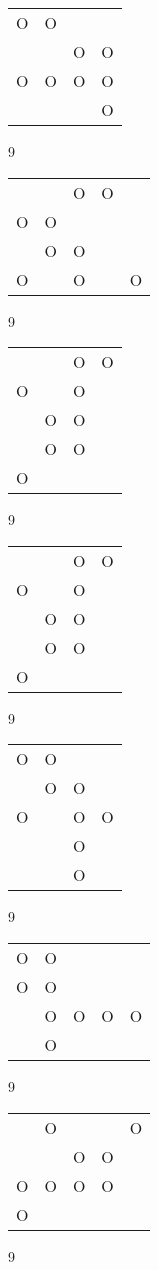 \begin{tabular}{|m{0.2cm}m{0.2cm}m{0.2cm}m{0.2cm}|}\hline
O&O& & \\
 & &O&O\\
O&O&O&O\\
 & & &O\\
\hline\end{tabular}9
\begin{tabular}{|m{0.2cm}m{0.2cm}m{0.2cm}m{0.2cm}m{0.2cm}|}\hline
 & &O&O& \\
O&O& & & \\
 &O&O& & \\
O& &O& &O\\
\hline\end{tabular}9
\begin{tabular}{|m{0.2cm}m{0.2cm}m{0.2cm}m{0.2cm}|}\hline
 & &O&O\\
O& &O& \\
 &O&O& \\
 &O&O& \\
O& & & \\
\hline\end{tabular}9
\begin{tabular}{|m{0.2cm}m{0.2cm}m{0.2cm}m{0.2cm}|}\hline
 & &O&O\\
O& &O& \\
 &O&O& \\
 &O&O& \\
O& & & \\
\hline\end{tabular}9
\begin{tabular}{|m{0.2cm}m{0.2cm}m{0.2cm}m{0.2cm}|}\hline
O&O& & \\
 &O&O& \\
O& &O&O\\
 & &O& \\
 & &O& \\
\hline\end{tabular}9
\begin{tabular}{|m{0.2cm}m{0.2cm}m{0.2cm}m{0.2cm}m{0.2cm}|}\hline
O&O& & & \\
O&O& & & \\
 &O&O&O&O\\
 &O& & & \\
\hline\end{tabular}9
\begin{tabular}{|m{0.2cm}m{0.2cm}m{0.2cm}m{0.2cm}m{0.2cm}|}\hline
 &O& & &O\\
 & &O&O& \\
O&O&O&O& \\
O& & & & \\
\hline\end{tabular}9
